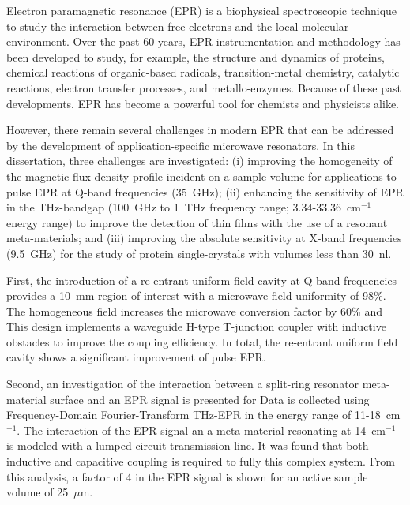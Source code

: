 

Electron paramagnetic resonance (EPR) is a biophysical spectroscopic technique to study the interaction between free electrons and the local molecular environment. Over the past 60 years, EPR instrumentation and methodology has been developed to study, for example, the structure and dynamics of proteins, chemical reactions of organic-based radicals, transition-metal chemistry, catalytic reactions, electron transfer processes, and metallo-enzymes. Because of these past developments, EPR has become a powerful tool for chemists and physicists alike. 

However, there remain several challenges in modern EPR that can be addressed by the development of application-specific microwave resonators. In this dissertation, three challenges are investigated: (i) improving the homogeneity of the magnetic flux density profile incident on a sample volume for applications to pulse EPR at Q-band frequencies (35~GHz); (ii) enhancing the sensitivity of EPR in the THz-bandgap (100~GHz to 1~THz frequency range; 3.34-33.36~cm$^{-1}$ energy range) to improve the detection of thin films with the use of a resonant meta-materials; and (iii) improving the absolute sensitivity at X-band frequencies (9.5~GHz) for the study of protein single-crystals with volumes less than 30~nl. 

First, the introduction of a re-entrant uniform field \cylTE{} cavity at Q-band frequencies provides a 10~mm region-of-interest with a microwave field uniformity of 98\%. The homogeneous field increases the microwave conversion factor by 60\% and  This design implements a waveguide H-type T-junction coupler with inductive obstacles to improve the coupling efficiency. In total, the re-entrant uniform field \cylTE{} cavity shows a significant improvement of pulse EPR.

Second, an investigation of the interaction between a split-ring resonator meta-material surface and an EPR signal is presented for 
Data is collected using Frequency-Domain Fourier-Transform THz-EPR in the energy range of 11-18~cm$^{-1}$. The interaction of the EPR signal an a meta-material resonating at 14~cm$^{-1}$ is modeled with a lumped-circuit transmission-line. It was found that both inductive and capacitive coupling is required to fully this complex system. From this analysis, a factor of 4 in the EPR signal is shown for an active sample volume of 25~$\mu$m.

